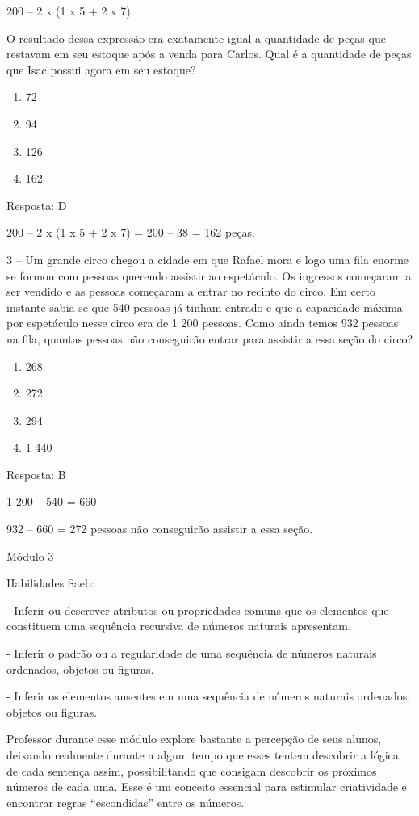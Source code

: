 200 -- 2 x (1 x 5 + 2 x 7)

O resultado dessa expressão era exatamente igual a quantidade de peças
que restavam em seu estoque após a venda para Carlos. Qual é a
quantidade de peças que Isac possui agora em seu estoque?

\begin{enumerate}
\def\labelenumi{\alph{enumi})}
\item
  72
\item
  94
\item
  126
\item
  162
\end{enumerate}

Resposta: D

200 -- 2 x (1 x 5 + 2 x 7) = 200 -- 38 = 162 peças.

3 -- Um grande circo chegou a cidade em que Rafael mora e logo uma fila
enorme se formou com pessoas querendo assistir ao espetáculo. Os
ingressos começaram a ser vendido e as pessoas começaram a entrar no
recinto do circo. Em certo instante sabia-se que 540 pessoas já tinham
entrado e que a capacidade máxima por espetáculo nesse circo era de 1
200 pessoas. Como ainda temos 932 pessoas na fila, quantas pessoas não
conseguirão entrar para assistir a essa seção do circo?

\begin{enumerate}
\def\labelenumi{\alph{enumi})}
\item
  268
\item
  272
\item
  294
\item
  1 440
\end{enumerate}

Resposta: B

1 200 -- 540 = 660

932 -- 660 = 272 pessoas não conseguirão assistir a essa seção.

Módulo 3

Habilidades Saeb:

- Inferir ou descrever atributos ou propriedades comuns que os elementos
que constituem uma sequência recursiva de números naturais apresentam.

- Inferir o padrão ou a regularidade de uma sequência de números
naturais ordenados, objetos ou figuras.

- Inferir os elementos ausentes em uma sequência de números naturais
ordenados, objetos ou figuras.

Professor durante esse módulo explore bastante a percepção de seus
alunos, deixando realmente durante a algum tempo que esses tentem
descobrir a lógica de cada sentença assim, possibilitando que consigam
descobrir os próximos números de cada uma. Esse é um conceito essencial
para estimular criatividade e encontrar regras ``escondidas'' entre os
números.

